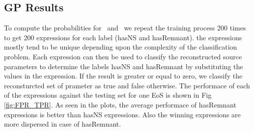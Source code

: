 \subsection{GP Results}

To compute the probabilities for \hasns\ and \hasrem\ we repeat the training process 200 times to get 200 expressions for each label (hasNS and hasRemnant).  the expressions mostly tend to be unique depending upon the complexity of the classification problem. Each expression can then be used to classify the reconstructed source parameters to determine the labels hasNS and hasRemnant by substituting the values in the expression. If the result is greater or equal to zero, we classify the reconsturcted set of prameter as true and false otherwise. The performace of each of the expressions against the testing set for one EoS is shown in Fig \ref{fig:FPR_TPR}. As seen in the plots, the average performace of hasRemnant expressions is better than hasNS expressions. Also the winning expressions are more dispersed in case of hasRemnant.


